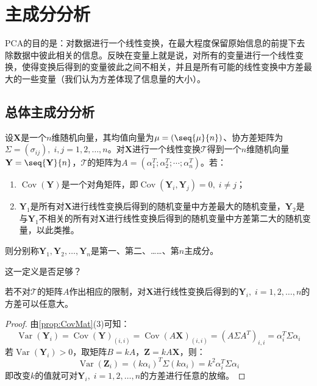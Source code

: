 \section{主成分分析}

\gls{PCA}的目的是：对数据进行一个线性变换，在最大程度保留原始信息的前提下去除数据中彼此相关的信息。反映在变量上就是说，对所有的变量进行一个线性变换，使得变换后得到的变量彼此之间不相关，并且是所有可能的线性变换中方差最大的一些变量（我们认为方差体现了信息量的大小）。

\subsection{总体主成分分析}
\begin{definition}
	设$\mathbf{X}$是一个$n$维随机向量，其均值向量为$\mu=(\seq{\mu}{n})$、协方差矩阵为$\Sigma=(\sigma_{ij}),\;i,j=1,2,\dots,n$。对$\mathbf{X}$进行一个线性变换$\mathcal{T}$得到一个$n$维随机向量$\mathbf{Y}=\seq{\mathbf{Y}}{n}$，$\mathcal{T}$的矩阵为$A=(\alpha_1^T;\alpha_2^T;\cdots;\alpha_n^T)$。若：
	\begin{enumerate}
		\item $\operatorname{Cov}(\mathbf{Y})$是一个对角矩阵，即$\operatorname{Cov}(\mathbf{Y}_i,\mathbf{Y}_j)=0,\;i\ne j$；
		\item $\mathbf{Y}_1$是所有对$\mathbf{X}$进行线性变换后得到的随机变量中方差最大的随机变量，$\mathbf{Y}_2$是与$\mathbf{Y}_1$不相关的所有对$\mathbf{X}$进行线性变换后得到的随机变量中方差第二大的随机变量，以此类推。
	\end{enumerate}
	则分别称$\mathbf{Y}_1,\mathbf{Y}_2,\dots,\mathbf{Y}_n$是第一、第二、……、第$n$主成分。
\end{definition}
这一定义是否足够？
\begin{theorem}
	若不对$\mathcal{T}$的矩阵$A$作出相应的限制，对$\mathbf{X}$进行线性变换后得到的$\mathbf{Y}_i,\;i=1,2,\dots,n$的方差可以任意大。
\end{theorem}
\begin{proof}
	由\cref{prop:CovMat}(3)可知：
	\begin{equation*}
		\operatorname{Var}(\mathbf{Y}_i)=\operatorname{Cov}(\mathbf{Y})_{(i,i)}=\operatorname{Cov}(A\mathbf{X})_{(i,i)}=(A\Sigma A^T)_{i,i}=\alpha_i^T\Sigma\alpha_i
	\end{equation*}
	若$\operatorname{Var}(\mathbf{Y}_i)>0$，取矩阵$B=kA$，$\mathbf{Z}=kA\mathbf{X}$，则：
	\begin{equation*}
		\operatorname{Var}(\mathbf{Z}_i)=(k\alpha_i)^T\Sigma(k\alpha_i)=k^2\alpha_i^T\Sigma\alpha_i
	\end{equation*}
	即改变$k$的值就可对$\mathbf{Y}_i,\;i=1,2,\dots,n$的方差进行任意的放缩。
\end{proof}

